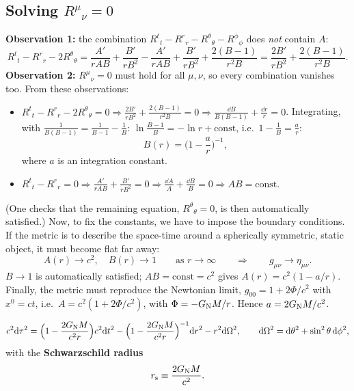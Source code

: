 \subsection{Solving $R^\mu{}_\nu=0$}
\textbf{Observation 1:} the combination $R^t{}_t-R^r{}_r-R^\theta{}_\theta-R^\phi{}_\phi$ does \emph{not} contain $A$:
\[
  R^t{}_t-R^r{}_r-2R^\theta{}_\theta=\frac{A'}{rAB}+\frac{B'}{rB^2}-\frac{A'}{rAB}+\frac{B'}{rB^2}+\frac{2(B-1)}{r^2B}=\frac{2B'}{rB^2}+\frac{2(B-1)}{r^2B}.
\]
\textbf{Observation 2:} $R^\mu{}_\nu=0$ must hold for all $\mu,\nu$, so every combination vanishes too. From these observations:
\begin{itemize}
\item $R^t{}_t-R^r{}_r-2R^\theta{}_\theta=0\Rightarrow\frac{2B'}{rB^2}+\frac{2(B-1)}{r^2B}=0\Rightarrow\frac{\dd B}{B(B-1)}+\frac{\dd r}{r}=0$. Integrating, with $\frac{1}{B(B-1)}=\frac1{B-1}-\frac1B$: $\ln\frac{B-1}{B}=-\ln r+\text{const}$, i.e.\ $1-\frac1B=\frac ar$:
\begin{equation}
  B(r)=\Big(1-\frac ar\Big)^{-1},
\end{equation}
where $a$ is an integration constant.
\item $R^t{}_t-R^r{}_r=0\Rightarrow\frac{A'}{rAB}+\frac{B'}{rB^2}=0\Rightarrow\frac{\dd A}{A}+\frac{\dd B}{B}=0\Rightarrow AB=\text{const}$.
\end{itemize}
(One checks that the remaining equation, $R^\theta{}_\theta=0$, is then automatically satisfied.) Now, to fix the constants, we have to impose the boundary conditions. If the metric is to describe the space-time around a spherically symmetric, static object, it must become flat far away:
\[
  A(r)\to c^2,\quad B(r)\to1\qquad\text{as }r\to\infty\qquad\Longrightarrow\qquad g_{\mu\nu}\to\eta_{\mu\nu}.
\]
$B\to1$ is automatically satisfied; $AB=\text{const}=c^2$ gives $A(r)=c^2(1-a/r)$. Finally, the metric must reproduce the Newtonian limit, $g_{00}=1+2\Phi/c^2$ with $x^0=ct$, i.e.\ $A=c^2(1+2\Phi/c^2)$, with $\Phi=-G_{\mathrm N} M/r$. Hence $a=2G_{\mathrm N} M/c^2$.

\begin{keyresult}
\begin{equation}
  c^2\mathrm{d}\tau^2=\Big(1-\frac{2G_{\mathrm N} M}{c^2r}\Big)c^2\mathrm{d} t^2-\Big(1-\frac{2G_{\mathrm N} M}{c^2r}\Big)^{-1}\mathrm{d} r^2-r^2\mathrm{d}\Omega^2 ,\qquad \mathrm{d}\Omega^2=\mathrm{d}\theta^2+\sin^2\theta\,\mathrm{d}\phi^2,
  \label{eq:schwarzschild}
\end{equation}
with the \textbf{Schwarzschild radius}
\begin{equation}
  r_{\mathrm s}\equiv\frac{2G_{\mathrm N} M}{c^2}.
\end{equation}
\end{keyresult}

